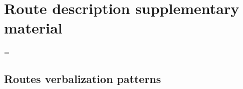 \chapter{Route description supplementary material}
\label{app:route}

\LTcapwidth=\textwidth


\let\oldlongtable\longtable
\let\endoldlongtable\endlongtable

\def\zza{\global\let\zz\zzb
\fullwidthcolor{lightgray}}%

\def\zzb{\global\let\zz\zza}

\def\fullwidthcolor#1{\color{#1}\leaders\vrule\hskip\textwidth\hskip-\textwidth\kern0pt}
\def\resetLTcolor{\global\let\zz\zza}


\section{Routes verbalization patterns}
\label{app:patterns}

